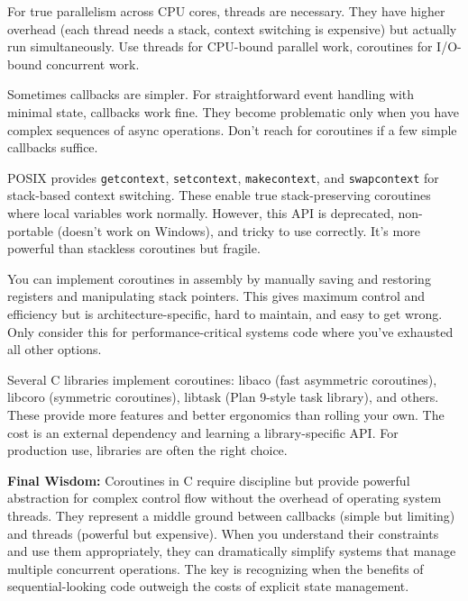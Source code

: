 \vspace{0.2cm}

\begin{description}[style=nextline,leftmargin=0pt]
    \item[\textbf{Threads}] For true parallelism across CPU cores, threads are necessary. They have higher overhead (each thread needs a stack, context switching is expensive) but actually run simultaneously. Use threads for CPU-bound parallel work, coroutines for I/O-bound concurrent work.

    \item[\textbf{Callbacks}] Sometimes callbacks are simpler. For straightforward event handling with minimal state, callbacks work fine. They become problematic only when you have complex sequences of async operations. Don't reach for coroutines if a few simple callbacks suffice.

    \item[\textbf{ucontext}] POSIX provides \texttt{getcontext}, \texttt{setcontext}, \texttt{makecontext}, and \texttt{swapcontext} for stack-based context switching. These enable true stack-preserving coroutines where local variables work normally. However, this API is deprecated, non-portable (doesn't work on Windows), and tricky to use correctly. It's more powerful than stackless coroutines but fragile.

    \item[\textbf{Assembly}] You can implement coroutines in assembly by manually saving and restoring registers and manipulating stack pointers. This gives maximum control and efficiency but is architecture-specific, hard to maintain, and easy to get wrong. Only consider this for performance-critical systems code where you've exhausted all other options.

    \item[\textbf{Libraries}] Several C libraries implement coroutines: libaco (fast asymmetric coroutines), libcoro (symmetric coroutines), libtask (Plan 9-style task library), and others. These provide more features and better ergonomics than rolling your own. The cost is an external dependency and learning a library-specific API. For production use, libraries are often the right choice.
\end{description}

\vspace{0.4cm}
\begin{tipbox}
\textbf{Final Wisdom:} Coroutines in C require discipline but provide powerful abstraction for complex control flow without the overhead of operating system threads. They represent a middle ground between callbacks (simple but limiting) and threads (powerful but expensive). When you understand their constraints and use them appropriately, they can dramatically simplify systems that manage multiple concurrent operations. The key is recognizing when the benefits of sequential-looking code outweigh the costs of explicit state management.
\end{tipbox}

